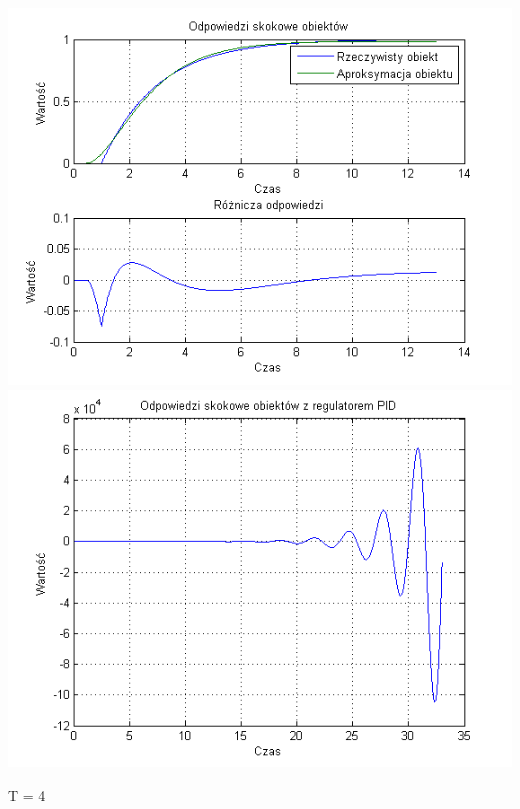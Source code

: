 \documentclass[10pt,a4paper]{article}
\begin{document}
\begin{center}
\includegraphics[scale=1]{images/dwa/skrypt_21.png}\\
\includegraphics[scale=1]{images/dwa/skrypt_22.png}\\
\end{center}
\newpage
T = 4
\end{document}
